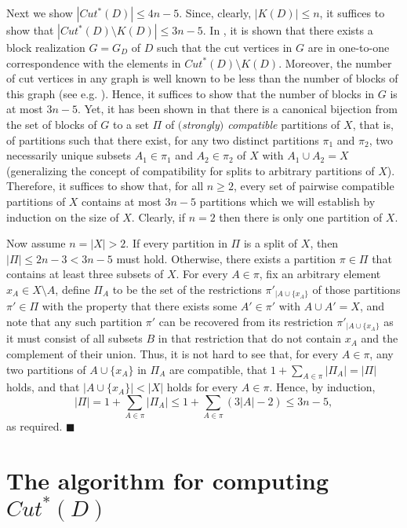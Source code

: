 \documentclass[12pt]{article}
\begin{document}
Next we show \(|Cut^*(D)| \le 4n - 5\). Since, clearly, \(|K(D)| \le n\), it
suffices to show that \(|Cut^*(D) \setminus K(D)| \le 3n - 5\). In \cite{dre-hub-koo-08a},
it is shown that there exists a block realization \(G=G_D\) of \(D\) such that
the cut vertices in \(G\) are in one-to-one correspondence with the elements
in \(Cut^*(D) \setminus K(D)\). Moreover, the number of cut vertices in any graph
is well known to be less than the number of blocks of this graph (see e.g. \cite{har-pri-66a}).
Hence, it suffices to show that the number of blocks in \(G\) is at most $3n-5$. 
Yet, it has been shown in \cite{dress:huber:compatible:decompositions:2008} that
there is a canonical bijection from the set of blocks of \(G\) to a set \(\Pi\) of
\emph{$($\!strongly$)$ compatible} partitions of \(X\), that is, of 
partitions such that there exist, for any two distinct partitions 
$\pi_1$ and $\pi_2$, two necessarily unique subsets \(A_1 \in \pi_1\) and \(A_2 \in \pi_2\) of $X$ with 
\(A_1 \cup A_2 = X\) (generalizing the concept of compatibility
for splits to arbitrary partitions of \(X\)). 
Therefore, it suffices to show that, for all $n\ge 2$, every set of pairwise compatible partitions of \(X\)
contains at most \(3n-5\) partitions which we will establish 
by induction on the size of \(X\). Clearly, if \(n=2\) then there is only one partition of \(X\).

Now assume \(n=|X| > 2\). If every partition in \(\Pi\) is
a split of \(X\), then \(|\Pi| \leq 2n-3 < 3n-5\) must hold.
Otherwise, there exists a partition \(\pi \in \Pi\) that
contains at least three subsets of \(X\). For every \(A \in \pi\), fix
an arbitrary element \(x_A \in X \setminus A\), define
\(\Pi_A\) to be the set of the restrictions \(\pi'_{|A \cup \{x_A\}}\) of those partitions  
\(\pi' \in \Pi\) with the property that there exists some \(A' \in \pi'\) with \(A \cup A' = X\), and note that any such partition $\pi'$ can be recovered from its restriction \(\pi'_{|A \cup \{x_A\}}\) as it must consist of all subsets $B$ in that restriction that do not contain $x_A$ and the complement of their union. Thus, it is not hard to see that, for every \(A \in \pi\), any
two partitions of \(A \cup \{x_A\}\) in \(\Pi_A\) are compatible,
that \(1 + \sum_{A \in \pi} |\Pi_A| = |\Pi|\) holds, and that \(|A \cup \{x_A\}| < |X|\) holds for every \(A \in \pi\). Hence, by induction,
\[
|\Pi| = 1 + \sum_{A \in \pi} |\Pi_A| \leq 1 + \sum_{A \in \pi} (3|A| - 2) \leq 3n-5,
\] 
as required.
\hfill\(\blacksquare\)


\section{The algorithm for computing $Cut^*(D)$}
\label{section:algorith:computing:cut:d}
\end{document}

